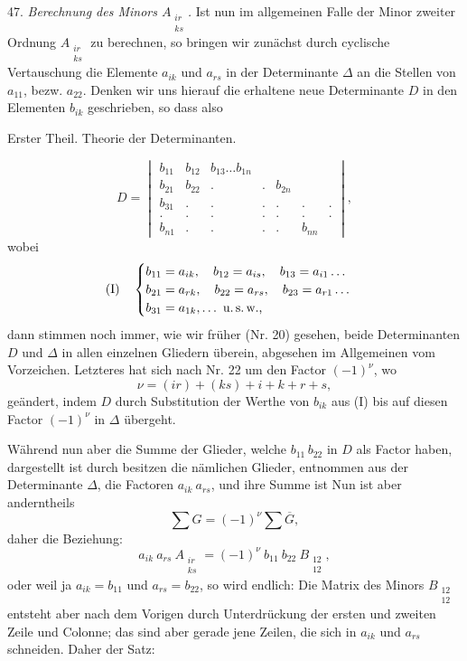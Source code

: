 47. \textit{Berechnung des Minors $A_{\substack{ir\\ks}}$.} Ist nun im allgemeinen Falle der Minor zweiter Ordnung $A_{\substack{ir\\ks}}$ zu berechnen, so bringen wir zunächst durch cyclische Vertauschung die Elemente $a_{ik}$ und $a_{rs}$ in der Determinante $\varDelta$ an die Stellen von $a_{11}$, bezw. $a_{22}$. Denken wir uns hierauf die erhaltene neue Determinante $D$ in den Elementen $b_{ik}$ geschrieben, so dass also


Erster Theil. Theorie der Determinanten.

\[
D = \begin{vmatrix} b_{11} & b_{12} & b_{13} \ldots b_{1n}\\ b_{21} & b_{22} & . & . & b_{2n}\\ b_{31} & . & . & . & . & . & .\\ . & . & . & . & . & . & .\\ b_{n1} & . & . & . & . & b_{nn} \end{vmatrix},
\]
wobei
\[
\text{(I)}\quad
\begin{cases}
b_{11} = a_{ik},\quad b_{12} = a_{is},\quad b_{13} = a_{i1}\ldots\\
b_{21} = a_{rk},\quad b_{22} = a_{rs},\quad b_{23} = a_{r1}\ldots\\
b_{31} = a_{1k},\ldots\ \text{u.\,s.\,w.,}
\end{cases}
\]
dann stimmen noch immer, wie wir früher (Nr. 20) gesehen, beide Determinanten $D$ und $\varDelta$ in allen einzelnen Gliedern überein, abgesehen im Allgemeinen vom Vorzeichen. Letzteres hat sich nach Nr. 22 um den Factor $(-1)^\nu$, wo
\[
\nu = (ir) + (ks) + i + k + r + s,
\]
geändert, indem $D$ durch Substitution der Werthe von $b_{ik}$ aus (I) bis auf diesen Factor $(-1)^\nu$ in $\varDelta$ übergeht.

Während nun aber die Summe der Glieder, welche $b_{11}\,b_{22}$ in $D$ als Factor haben, dargestellt ist durch
besitzen die nämlichen Glieder, entnommen aus der Determinante $\varDelta$, die Factoren $a_{ik}\ a_{rs}$, und ihre Summe ist
Nun ist aber anderntheils
\[
\sum G = (-1)^\nu \sum \overline{G},
\]
daher die Beziehung:
\[
a_{ik}\ a_{rs}\ A_{\substack{ir\\ks}} = (-1)^\nu\ b_{11}\ b_{22}\ B_{\substack{12\\12}},
\]
oder weil ja $a_{ik} = b_{11}$ und $a_{rs} = b_{22}$, so wird endlich:
Die Matrix des Minors $B_{\substack{12\\12}}$ entsteht aber nach dem Vorigen durch Unterdrückung der ersten und zweiten Zeile und Colonne; das sind aber gerade jene Zeilen, die sich in $a_{ik}$ und $a_{rs}$ schneiden. Daher der Satz:


